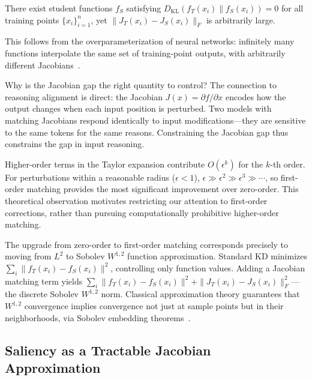 \begin{corollary}\label{cor:no-guarantee}
There exist student functions $f_S$ satisfying $D_\mathrm{KL}(f_T(x_i) \| f_S(x_i)) = 0$ for all training points $\{x_i\}_{i=1}^n$, yet $\|J_T(x_i) - J_S(x_i)\|_F$ is arbitrarily large.
\end{corollary}

This follows from the overparameterization of neural networks: infinitely many functions interpolate the same set of training-point outputs, with arbitrarily different Jacobians~\citep{srinivas2018knowledge}.

Why is the Jacobian gap the right quantity to control? The connection to reasoning alignment is direct: the Jacobian $J(x) = \partial f / \partial x$ encodes how the output changes when each input position is perturbed. Two models with matching Jacobians respond identically to input modifications---they are sensitive to the same tokens for the same reasons. Constraining the Jacobian gap thus constrains the gap in input reasoning.

\begin{remark}\label{rem:higher-order}
Higher-order terms in the Taylor expansion contribute $O(\epsilon^k)$ for the $k$-th order. For perturbations within a reasonable radius ($\epsilon < 1$), $\epsilon \gg \epsilon^2 \gg \epsilon^3 \gg \cdots$, so first-order matching provides the most significant improvement over zero-order. This theoretical observation motivates restricting our attention to first-order corrections, rather than pursuing computationally prohibitive higher-order matching.
\end{remark}

\begin{remark}\label{rem:sobolev}
The upgrade from zero-order to first-order matching corresponds precisely to moving from $L^2$ to Sobolev $W^{1,2}$ function approximation. Standard KD minimizes $\sum_i \|f_T(x_i) - f_S(x_i)\|^2$, controlling only function values. Adding a Jacobian matching term yields $\sum_i \|f_T(x_i) - f_S(x_i)\|^2 + \|J_T(x_i) - J_S(x_i)\|_F^2$---the discrete Sobolev $W^{1,2}$ norm. Classical approximation theory guarantees that $W^{1,2}$ convergence implies convergence not just at sample points but in their neighborhoods, via Sobolev embedding theorems~\citep{czarnecki2017sobolev}.
\end{remark}


\subsection{Saliency as a Tractable Jacobian Approximation}\label{sec:saliency-approx}

